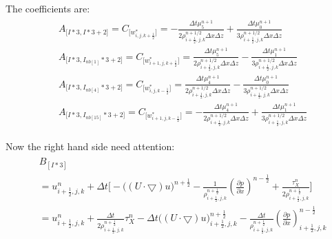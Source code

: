 \documentclass{article}
\numberwithin{equation}{subsection}
\begin{document}
The coefficients are:
\begin{align}
\begin{split}
& A_{\Big[I*3,I*3+2\Big]} = C_{\Big[w^*_{i,j,k+\frac{1}{2}}\Big]} = -\frac{\Delta t\mu^{n+1}_5}{2\rho^{n+1/2}_{i+\frac{1}{2},j,k} \Delta x \Delta z} + \frac{\Delta t\mu^{n+1}_0}{3\rho^{n+1/2}_{i+\frac{1}{2},j,k} \Delta x \Delta z} \\
& A_{\Big[I*3,I_{nb[1]}*3+2\Big]} = C_{\Big[w^*_{i+1,j,k+\frac{1}{2}}\Big]} = \frac{\Delta t \mu^{n+1}_5}{2\rho^{n+1/2}_{i+\frac{1}{2},j,k} \Delta x \Delta z} - \frac{\Delta t\mu^{n+1}_1}{3\rho^{n+1/2}_{i+\frac{1}{2},j,k} \Delta x \Delta z} \\
& A_{\Big[I*3,I_{nb[4]}*3+2\Big]} = C_{\Big[w^*_{i,j,k-\frac{1}{2}}\Big]} = \frac{\Delta t \mu^{n+1}_4}{2\rho^{n+1/2}_{i+\frac{1}{2},j,k} \Delta x \Delta z} - \frac{\Delta t \mu^{n+1}_0}{3\rho^{n+1/2}_{i+\frac{1}{2},j,k} \Delta x\Delta z} \\
& A_{\Big[I*3,I_{nb[15]}*3+2\Big]} = C_{\Big[w^*_{i+1,j,k-\frac{1}{2}}\Big]} = -\frac{\Delta t \mu^{n+1}_4}{2\rho^{n+1/2}_{i+\frac{1}{2},j,k} \Delta x \Delta z} + \frac{\Delta t \mu^{n+1}_1}{3\rho^{n+1/2}_{i+\frac{1}{2},j,k} \Delta x\Delta z}
\end{split}
\end{align}

Now the right hand side need attention:
\begin{align}
\begin{split}
& B_{[I*3]} \\
& = u^n_{i+\frac{1}{2},j,k} + \Delta t \Bigg[ -\Big( (U \cdot \bigtriangledown) u\Big)^{n+\frac{1}{2}}
 -\frac{1}{\rho^{n+\frac{1}{2}}_{i+\frac{1}{2},j,k}} (\frac{\partial p}{\partial x})^{n-\frac{1}{2}} + \frac{\tau^{n}_X}{2\rho^{n+\frac{1}{2}}_{i+\frac{1}{2},j,k}} \Bigg] \\
& = u^n_{i+\frac{1}{2},j,k} + \frac{\Delta t}{2\rho^{n+\frac{1}{2}}_{i+\frac{1}{2},j,k}}\tau^n_X - \Delta t\Big( (U \cdot \bigtriangledown) u\Big)^{n+\frac{1}{2}}_{i+\frac{1}{2},j,k} - \frac{\Delta t}{\rho^{n+\frac{1}{2}}_{i+\frac{1}{2},j,k}} (\frac{\partial p}{\partial x})^{n-\frac{1}{2}}_{i+\frac{1}{2},j,k}\\
\end{split}
\end{align}



\end{document}
